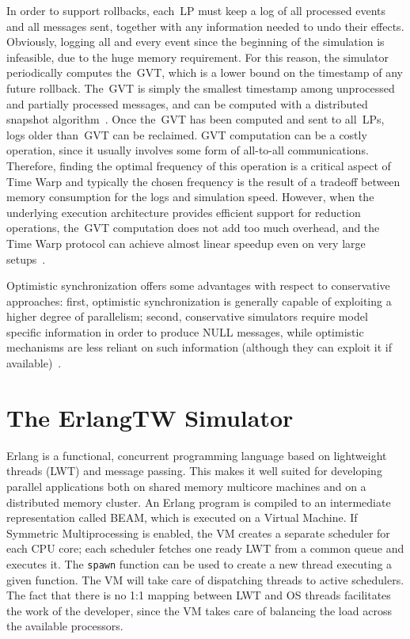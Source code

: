 \documentclass{sigplanconf}
\begin{document}
In order to support rollbacks, each~\ac{LP} must keep a log of all
processed events and all messages sent, together with any information
needed to undo their effects. Obviously, logging all and every event
since the beginning of the simulation is infeasible, due to the huge
memory requirement. For this reason, the simulator periodically
computes the~\ac{GVT}, which is a lower bound on the timestamp of any
future rollback. The~\ac{GVT} is simply the smallest timestamp among
unprocessed and partially processed messages, and can be computed with
a distributed snapshot algorithm~\cite{Fuj00}. Once the~\ac{GVT} has
been computed and sent to all~\acp{LP}, logs older than~\ac{GVT} can
be reclaimed. \ac{GVT} computation can be a costly operation, since it
usually involves some form of all-to-all communications. Therefore,
finding the optimal frequency of this operation is a critical aspect
of Time Warp and typically the chosen frequency is the result of a
tradeoff between memory consumption for the logs and simulation speed.
However, when the underlying execution architecture provides efficient
support for reduction operations, the~\ac{GVT} computation does not
add too much overhead, and the Time Warp protocol can achieve almost
linear speedup even on very large setups~\cite{Perumalla11}.

Optimistic synchronization offers some advantages with respect to
conservative approaches: first, optimistic synchronization is
generally capable of exploiting a higher degree of parallelism;
second, conservative simulators require model specific information in
order to produce NULL messages, while optimistic mechanisms are less
reliant on such information (although they can exploit it if
available)~\cite{Fujimoto:1989:PDE:76738.76741}. 

\section{The ErlangTW Simulator}\label{sec:erlangtw}

Erlang is a functional, concurrent programming language based on
lightweight threads (LWT) and message passing. This makes it well
suited for developing parallel applications both on shared memory
multicore machines and on a distributed memory cluster. An Erlang
program is compiled to an intermediate representation called BEAM,
which is executed on a Virtual Machine. If Symmetric Multiprocessing
is enabled, the VM creates a separate scheduler for each CPU core;
each scheduler fetches one ready LWT from a common queue and executes
it. The \verb+spawn+ function can be used to create a new thread
executing a given function. The VM will take care of dispatching
threads to active schedulers. The fact that there is no 1:1 mapping
between LWT and OS threads facilitates the work of the developer,
since the VM takes care of balancing the load across the available
processors.
\end{document}
